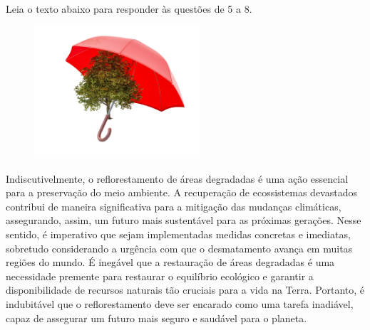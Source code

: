 



%
%



Leia o texto abaixo para responder às questões de 5 a 8.

\begin{myquote}


\begin{figure}  %
  \centering
  \includegraphics[width=0.55\textwidth]{./imgSAEB_7_POR/media/image49.png}
\end{figure}
Indiscutivelmente, o reflorestamento de áreas degradadas é uma ação essencial
para a preservação do meio ambiente. A recuperação de
ecossistemas devastados contribui de maneira significativa para a mitigação das
mudanças climáticas, assegurando, assim, um futuro mais sustentável para as
próximas gerações. Nesse sentido, é imperativo que sejam implementadas medidas
concretas e imediatas, sobretudo considerando a urgência com que o
desmatamento avança em muitas regiões do mundo. É inegável que a restauração
de áreas degradadas é uma necessidade premente para restaurar o equilíbrio
ecológico e garantir a disponibilidade de recursos naturais tão cruciais para
a vida na Terra. Portanto, é indubitável que o reflorestamento deve ser
encarado como uma tarefa inadiável, capaz de assegurar um futuro mais seguro e
saudável para o planeta.



\end{myquote}

